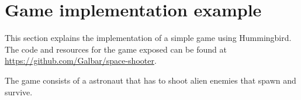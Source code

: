 \chapter{Game implementation example}

This section explains the implementation of a simple game using Hummingbird. The code 
and resources for the game exposed can be found at \url{https://github.com/Galbar/space-shooter}.

The game consists of a astronaut that has to shoot alien enemies that spawn and survive.









